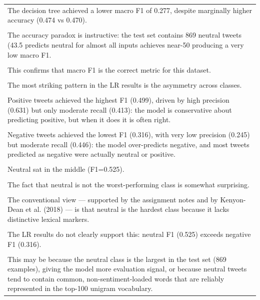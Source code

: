 \documentclass[11pt]{article}
\begin{document}
\begin{longtable}{|p{\dimexpr\linewidth-2\tabcolsep-2\arrayrulewidth\relax}|}
\hline
\rule{0pt}{3.5cm} \\
\hline
The decision tree achieved a lower macro F1 of 0.277, despite marginally higher accuracy (0.474 vs 0.470). \\[2pt]
\hline
\rule{0pt}{3.5cm} \\
\hline
The accuracy paradox is instructive: the test set contains 869 neutral tweets (43.5 predicts neutral for almost all inputs achieves near-50 producing a very low macro F1. \\[2pt]
\hline
\rule{0pt}{3.5cm} \\
\hline
This confirms that macro F1 is the correct metric for this dataset. \\[2pt]
\hline
\rule{0pt}{3.5cm} \\
\hline
The most striking pattern in the LR results is the asymmetry across classes. \\[2pt]
\hline
\rule{0pt}{3.5cm} \\
\hline
Positive tweets achieved the highest F1 (0.499), driven by high precision (0.631) but only moderate recall (0.413): the model is conservative about predicting positive, but when it does it is often right. \\[2pt]
\hline
\rule{0pt}{3.5cm} \\
\hline
Negative tweets achieved the lowest F1 (0.316), with very low precision (0.245) but moderate recall (0.446): the model over-predicts negative, and most tweets predicted as negative were actually neutral or positive. \\[2pt]
\hline
\rule{0pt}{3.5cm} \\
\hline
Neutral sat in the middle (F1=0.525). \\[2pt]
\hline
\rule{0pt}{3.5cm} \\
\hline
The fact that neutral is not the worst-performing class is somewhat surprising. \\[2pt]
\hline
\rule{0pt}{3.5cm} \\
\hline
The conventional view --- supported by the assignment notes and by Kenyon-Dean et al. (2018) --- is that neutral is the hardest class because it lacks distinctive lexical markers. \\[2pt]
\hline
\rule{0pt}{3.5cm} \\
\hline
The LR results do not clearly support this: neutral F1 (0.525) exceeds negative F1 (0.316). \\[2pt]
\hline
\rule{0pt}{3.5cm} \\
\hline
This may be because the neutral class is the largest in the test set (869 examples), giving the model more evaluation signal, or because neutral tweets tend to contain common, non-sentiment-loaded words that are reliably represented in the top-100 unigram vocabulary. \\[2pt]

\end{longtable}
\end{document}
